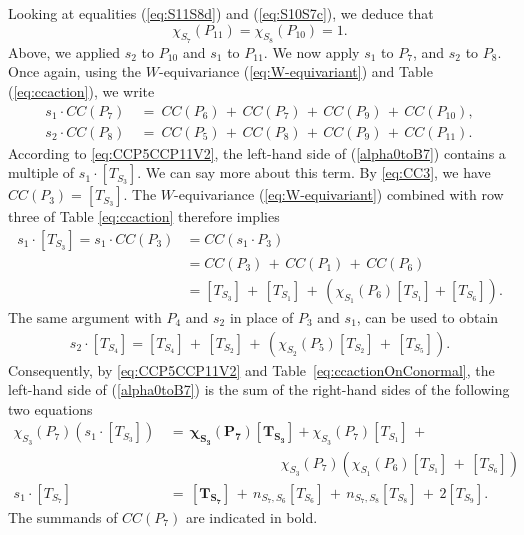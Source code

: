 \documentclass[a4paper, 11pt]{article}
\begin{document}
Looking at equalities (\ref{eq:S11S8d}) and (\ref{eq:S10S7c}), we deduce that
\begin{equation}\label{eq:S7P11S8P10}
\chi^{}_{S_7}(P_{11})=\chi^{}_{S_8}(P_{10})=1.
\end{equation}
Above, we applied $s_{2}$ to $P_{10}$ and $s_{1}$ to $P_{11}$. 
We now apply 
$s_{1}$ to $P_7$, and $s_{2}$ to $P_8$.
Once again, using the $W$-equivariance (\ref{eq:W-equivariant}) and Table
(\ref{eq:ccaction}), we write 
\begin{align}
s_{1}\cdot CC(P_7)\ &=\ CC(P_6)\, +\, CC(P_7)\, +\, CC(P_9)\, +\, CC(P_{10}),
\label{alpha0toB7}
\\
s_{2}\cdot CC(P_8)\ &=\ CC(P_5)\, +\, CC(P_8)\, +\, CC(P_9)\, +\, CC(P_{11}).
\label{alpha1toB8}
\end{align}
According to \eqref{eq:CCP5CCP11V2}, the left-hand side of
(\ref{alpha0toB7})  contains a  multiple of 
$s_{1} \cdot [T_{S_3}]$.  We can say more about this term.  By
\eqref{eq:CC3}, we have $CC(P_3)=[T_{S_3}]$.  The $W$-equivariance
(\ref{eq:W-equivariant}) combined with row three of Table
\ref{eq:ccaction} therefore implies 
\begin{align*}
s_{1}\cdot[T_{S_3}]= s_{1}\cdot CC(P_3)&=CC(s_1\cdot P_3)\\
&=CC(P_3)\, +\, CC(P_1)\, +\, CC(P_6)\\
&=[T_{S_3}]\, +\, [T_{S_1}]\, +\,  \left(\chi_{S_1}(P_6)[T_{S_1}]+[T_{S_6}]\right).
\end{align*} 
The same argument with $P_4$ and $s_{2}$ in place of 
$P_3$ and $s_{1}$, can be used to obtain
\begin{align}\label{eq:TS4}
s_{2}\cdot[T_{S_4}]=[T_{S_4}]\, +\,  [T_{S_2}]\, +\, 
\left(\chi_{S_2}^{}(P_{5})[T_{S_2}]\, +\, [T_{S_5}]\right).
\end{align}
Consequently, by \eqref{eq:CCP5CCP11V2} and
Table~\ref{eq:ccactionOnConormal}, the left-hand side of
(\ref{alpha0toB7}) is the sum of the  
right-hand sides of the following two equations 
\begin{align}
\chi_{S_3}^{}(P_7)(s_{1}\cdot [T_{S_3}])\, &=\,
\mathbf{\chi_{S_3}^{}(P_7)[T_{S_3}]}+  
 \chi_{S_3}^{}(P_7)[T_{S_1}]\, +\nonumber\\
 &\qquad\qquad\qquad\qquad
 \chi_{S_3}^{}(P_{7})\left(\chi_{S_1}^{}(P_{6})[T_{S_1}]\, +\,
     [T_{S_6}]\right)\label{eq:alpha2S3}\\ 
s_{1}\cdot [T_{S_7}]\, &=\, \mathbf{[T_{S_7}]}\, +\, 
n_{S_7,S_6}  [T_{S_6}]\, +\, n_{S_7,S_8} [T_{S_8}]\, +\, 2 [T_{S_9}]. \label{eq:nS7S8}
\end{align}
The summands of $CC(P_7)$ are indicated in bold.
\end{document}
